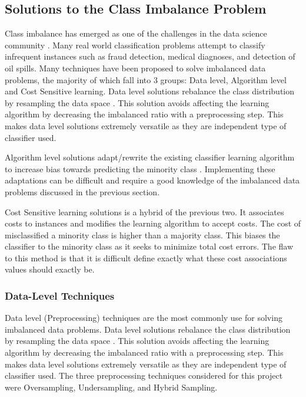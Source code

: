 \subsection{Solutions to the Class Imbalance Problem}
Class imbalance has emerged as one of the challenges in the data science community \cite{Imbalsourcesmall} \cite{Imbalsources1}. Many real world classification problems attempt to classify infrequent instances such as fraud detection, medical diagnoses, and detection of oil spills. Many techniques have been proposed to solve imbalanced data problems, the majority of which fall into 3 groups: Data level, Algorithm level and Cost Sensitive learning.
Data level solutions rebalance the class distribution by resampling the data space \cite{Imbalsourcesmall}. This solution avoids affecting the learning algorithm by decreasing the imbalanced ratio with a preprocessing step. This makes data level solutions extremely versatile as they are independent type of classifier used.

Algorithm level solutions adapt/rewrite the existing classifier learning algorithm to increase bias towards predicting the minority class \cite{Imbalsource2}. Implementing these adaptations can be difficult and require a good knowledge of the imbalanced data problems discussed in the previous section.

Cost Sensitive learning solutions is a hybrid of the previous two. It associates costs to instances and modifies the learning algorithm to accept costs. The cost of misclassified a minority class is higher than a majority class. This biases the classifier to the minority class as it seeks to minimize total cost errors. The flaw to this method is that it is difficult define exactly what these cost associations values should exactly be.

\subsubsection{Data-Level Techniques}
Data level (Preprocessing) techniques are the most commonly use for solving imbalanced data problems. Data level solutions rebalance the class distribution by resampling the data space \cite{Imbalsourcesmall}. This solution avoids affecting the learning algorithm by decreasing the imbalanced ratio with a preprocessing step. This makes data level solutions extremely versatile as they are independent type of classifier used. The three preprocessing techniques considered for this project were Oversampling, Undersampling, and Hybrid Sampling.

